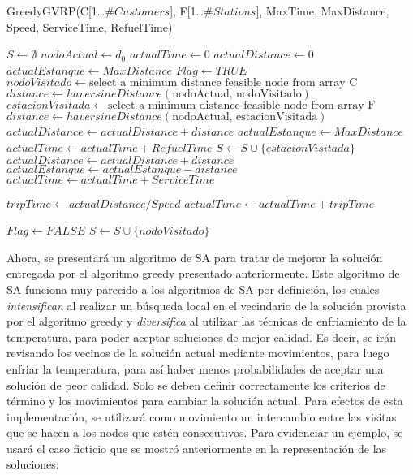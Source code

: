 \documentclass[letter, 10pt]{article}
\begin{document}
\begin{algorithm}
\caption{GreedyGVRP(C[1\ldots $\#Customers$], F[1\ldots $\#Stations$], MaxTime, MaxDistance, Speed,  ServiceTime, RefuelTime)}\label{alg:cap}
    \begin{algorithmic}
        \State $S \gets \emptyset$
        \State $nodoActual \gets d_0$
        \State $actualTime \gets 0$
        \State $actualDistance \gets 0$
        \State $actualEstanque \gets MaxDistance$
        \State $Flag \gets TRUE$
            \State $nodoVisitado \gets \text{select a minimum distance feasible node from array C}$
            \State $distance \gets haversineDistance(\text{nodoActual, nodoVisitado})$
                \State $estacionVisitada \gets \text{select a minimum distance feasible node from array F}$
                \State $distance \gets haversineDistance(\text{nodoActual, estacionVisitada})$
                \State $actualDistance \gets actualDistance + distance$
                \State $actualEstanque \gets MaxDistance$
                \State $actualTime \gets actualTime + RefuelTime$
                \State $S \gets S \cup \{estacionVisitada\}$
            \Else
                \State $actualDistance \gets actualDistance + distance$
                \State $actualEstanque \gets actualEstanque - distance$
                \State $actualTime \gets actualTime + ServiceTime$
            \EndIf
            
            \State $tripTime \gets actualDistance/Speed$
            \State $actualTime \gets actualTime + tripTime$

            
                \State $Flag \gets FALSE$
            \Else
                \State $S \gets S \cup \{nodoVisitado\}$
            \EndIf
        \EndWhile
    \end{algorithmic}
\end{algorithm}

\newpage
Ahora, se presentará un algoritmo de SA para tratar de mejorar la solución entregada por el algoritmo greedy presentado anteriormente. Este algoritmo de SA funciona muy parecido a los algoritmos de SA por definición, los cuales \emph{intensifican} al realizar un búsqueda local en el vecindario de la solución provista por el algoritmo greedy y \emph{diversifica} al utilizar las técnicas de enfriamiento de la temperatura, para poder aceptar soluciones de mejor calidad. Es decir, se irán revisando los vecinos de la solución actual mediante movimientos, para luego enfriar la temperatura, para así haber menos probabilidades de aceptar una solución de peor calidad. Solo se deben definir correctamente los criterios de término y los movimientos para cambiar la solución actual. Para efectos de esta implementación, se utilizará como movimiento un intercambio entre las visitas que se hacen a los nodos que estén consecutivos. Para evidenciar un ejemplo, se usará el caso ficticio que se mostró anteriormente en la representación de las soluciones:\\
\end{document}
